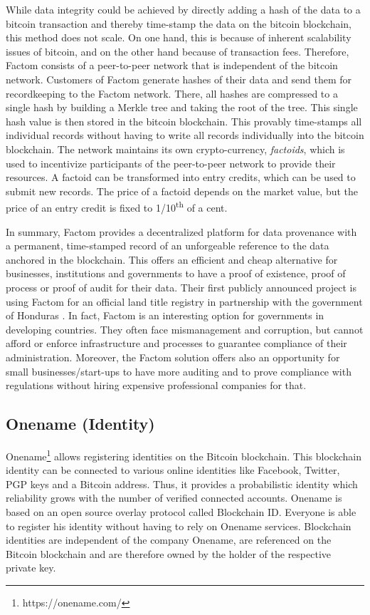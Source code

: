 While data integrity could be achieved by directly adding a hash of the data to 
a bitcoin transaction and thereby time-stamp the data on the bitcoin blockchain, 
this method does not scale. On one hand, this is because of inherent scalability 
issues of bitcoin, and on the other hand because of transaction fees. Therefore, 
Factom consists of a peer-to-peer network that is independent of the bitcoin network. 
Customers of Factom generate hashes of their data and send them for recordkeeping 
to the Factom network. There, all hashes are compressed to a single hash by building 
a Merkle tree and taking the root of the tree. This single hash 
value is then stored in the bitcoin blockchain. This provably time-stamps all individual 
records without having to write all records individually into the bitcoin blockchain. 
The network maintains its own crypto-currency, \emph{factoids}, which is used to incentivize 
participants of the peer-to-peer network to provide their resources. A factoid 
can be transformed into entry credits, which can be used to submit new records. 
The price of a factoid depends on the market value, but the price of an entry credit 
is fixed to 1/10\textsuperscript{th} of a cent. 

In summary, Factom provides a decentralized platform for data provenance with a 
permanent, time-stamped record of an unforgeable reference to the data anchored 
in the blockchain. This offers an efficient and cheap alternative for businesses, 
institutions and governments to have a proof of existence, proof of process or 
proof of audit for their data. Their first publicly announced project is using 
Factom for an official land title registry in partnership with the government of 
Honduras \parencite{Chavez2015}. In fact, Factom is an interesting option for 
governments in developing countries. They often face mismanagement and corruption, 
but cannot afford or enforce infrastructure and processes to guarantee compliance 
of their administration. Moreover, the Factom solution offers also an opportunity 
for small businesses/start-ups to have more auditing and to prove compliance with 
regulations without hiring expensive professional companies for that.

\subsection{Onename (Identity)}
\label{sec:ecoonename}

Onename\footnote{https://onename.com/} allows registering identities on the Bitcoin blockchain. This blockchain 
identity can be connected to various online identities like Facebook, Twitter, 
PGP keys and a Bitcoin address. Thus, it provides a probabilistic identity which 
reliability grows with the number of verified connected accounts. Onename is based 
on an open source overlay protocol called Blockchain ID. Everyone is able to register 
his identity without having to rely on Onename services. Blockchain identities 
are independent of the company Onename, are referenced on the Bitcoin blockchain 
and are therefore owned by the holder of the respective private key.

